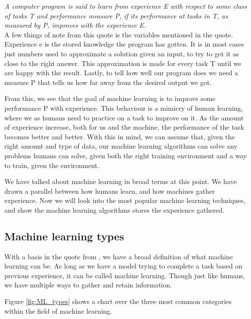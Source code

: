 \textit{ A computer program is said to learn from experience E with respect to some class of tasks T and performance measure P, if its performance at tasks in T, as measured by P, improves with the experience E. } \cite{MitchellTomM1997Ml}\\

\vspace{10px}
A few things of note from this quote is the variables mentioned in the quote. Experience e is the stored knowledge the program has gotten. It is in most cases just numbers used to approximate a solution given an input, to try to get it as close to the right answer. This approximation is made for every task T until we are happy with the result.
Lastly, to tell how well our program does we need a measure P that tells us how far away from the desired output we got.
   
From this, we see that the goal of machine learning is to improve some performance P with experience. This behaviour is a mimicry of human learning, where we as humans need to practice on a task to improve on it.
As the amount of experience increase, both for us and the machine, the performance of the task becomes better and better. With this in mind, we can assume that, given the right amount and type of data, our machine learning algorithms can solve any problems humans can solve, given both the right training environment and a way to train, given the environment.

We have talked about machine learning in broad terms at this point. We have drawn a parallel between how humans learn, and how machines gather experience.  Now we will look into the most popular machine learning techniques, and show the machine learning algorithms stores the experience gathered.
 
\subsection{Machine learning types}
With a basis in the quote from \cite{MitchellTomM1997Ml} , we have a broad definition of what machine learning can be.
As long as we have a model trying to complete a task based on previous experience, it can be called machine learning. Though just like humans, we have multiple ways to gather and retain information.

Figure \ref{fig:ML_types} shows a chart over the three most common categories within the field of machine learning. 

